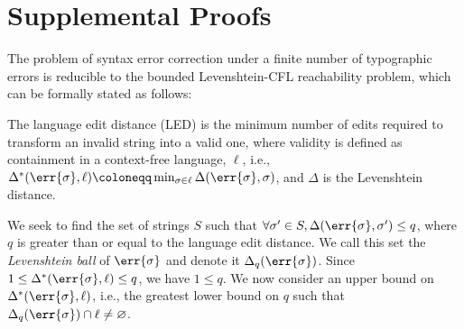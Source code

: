 \documentclass[runningheads]{llncs}
\begin{document}
%

\section{Supplemental Proofs}

  The problem of syntax error correction under a finite number of typographic errors is reducible to the bounded Levenshtein-CFL reachability problem, which can be formally stated as follows:

  \begin{definition}
    The language edit distance (LED) is the minimum number of edits required to transform an invalid string into a valid one, where validity is defined as containment in a context-free language, $\ell$, i.e., $\Delta^*(\err{\sigma}, \ell) \coloneqq \min_{\sigma \in \ell}\Delta(\err{\sigma}, \sigma)$, and $\Delta$ is the Levenshtein distance.
  \end{definition}

  We seek to find the set of strings $S$ such that $\forall \sigma'\in S, \Delta(\err{\sigma}, \sigma') \leq q$, where $q$ is greater than or equal to the language edit distance. We call this set the \textit{Levenshtein ball} of $\err{\sigma}$ and denote it $\Delta_q(\err{\sigma})$. Since $1 \leq \Delta^*(\err{\sigma}, \ell) \leq q$, we have $1 \leq q$. We now consider an upper bound on $\Delta^*(\err{\sigma}, \ell)$, i.e., the greatest lower bound on $q$ such that $\Delta_q(\err{\sigma}) \cap \ell \neq \varnothing$.
\end{document}
